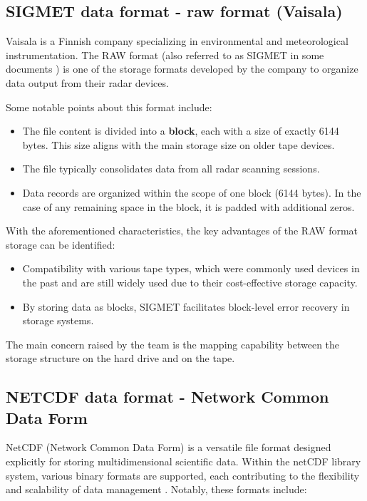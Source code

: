 \subsection{SIGMET data format - raw format (Vaisala)}
\label{sigmet}
Vaisala is a Finnish company specializing in environmental and meteorological instrumentation. The RAW format (also referred to as SIGMET in some documents \cite{lrose_RadxConvert}) is one of the storage formats developed by the company to organize data output from their radar devices.

Some notable points about this format include:

\begin{itemize}
    \item The file content is divided into a \textbf{block}, each with a size of exactly 6144 bytes. This size aligns with the main storage size on older tape devices.
    \item The file typically consolidates data from all radar scanning sessions.
    \item Data records are organized within the scope of one block (6144 bytes). In the case of any remaining space in the block, it is padded with additional zeros.
\end{itemize}

With the aforementioned characteristics, the key advantages of the RAW format storage can be identified: \cite{raw_product_format_vaisala}

\begin{itemize}
    \item Compatibility with various tape types, which were commonly used devices in the past and are still widely used due to their cost-effective storage capacity.
    \item By storing data as blocks, SIGMET facilitates block-level error recovery in storage systems.
\end{itemize}

The main concern raised by the team is the mapping capability between the storage structure on the hard drive and on the tape.

\subsection{NETCDF data format - Network Common Data Form}

NetCDF (Network Common Data Form) is a versatile file format designed explicitly for storing multidimensional scientific data. Within the netCDF library system, various binary formats are supported, each contributing to the flexibility and scalability of data management \cite{netcdf}. Notably, these formats include:

